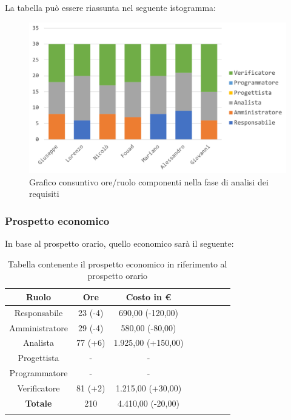 			La tabella può essere riassunta nel seguente istogramma:
			
			\begin{figure}[H]
				\centering
				\includegraphics[width=0.8\linewidth]{images/consuntivo/analisiCons1.png}
				\caption{Grafico consuntivo ore/ruolo componenti nella fase di analisi dei requisiti}
				\label{fig:consuntivo grafico suddivisione ruoli fase analisi dei requisiti}
			\end{figure}
			
		\subsubsection{Prospetto economico}
			In base al prospetto orario, quello economico sarà il seguente: 
			
			\begin{longtable}{|c|c|c|c|c|c|c|c}
				\hline
				\rowcolor{lighter-grayer}
				\textbf{Ruolo} & \textbf{Ore} & \textbf{Costo in €} \\
				\hline
				\endfirsthead
				
				\hline
				Responsabile & 23 (-4) & 690,00 (-120,00)\\
				\hline
				\hline
				Amministratore & 29 (-4) & 580,00 (-80,00)\\
				\hline
				\hline
				Analista & 77 (+6) & 1.925,00 (+150,00)\\
				\hline
				\hline
				Progettista & - & -\\
				\hline
				\hline
				Programmatore & - & -\\
				\hline
				\hline
				Verificatore & 81 (+2) & 1.215,00 (+30,00)\\
				\hline
				\textbf{Totale} & 210 & 4.410,00 (-20,00)\\
				\hline
				\caption{Tabella contenente il prospetto economico in riferimento al prospetto orario}
			\end{longtable}
			\pagebreak
			

